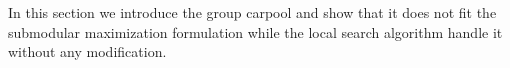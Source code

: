 In this section we introduce the group carpool and show that it does not fit the
submodular maximization formulation while the local search algorithm handle it
without any modification.